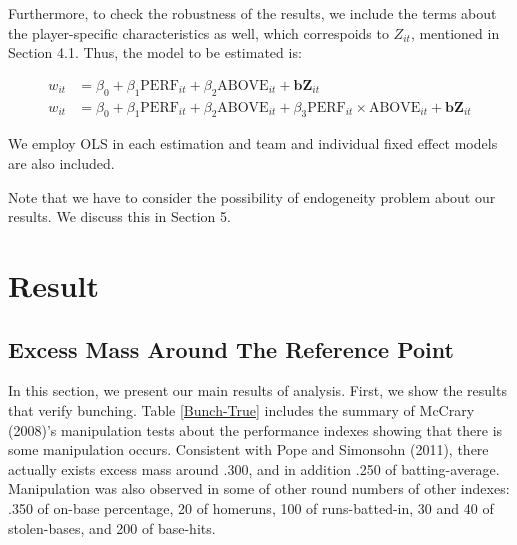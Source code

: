 \documentclass[dvipdfmx, 12pt]{article}
\begin{document}
  Furthermore, to check the robustness of the results, we include the terms about the player-specific characteristics as well, which correspoids to $Z_{it}$, mentioned in Section 4.1. Thus, the model to be estimated is:

  \begin{align*}
    w_{it} & = \beta_0 + \beta_1 \text{PERF}_{it} + \beta_2 \text{ABOVE}_{it} + \mathbf{b} \mathbf{Z}_{it} \\
    w_{it} &= \beta_0 + \beta_1 \text{PERF}_{it} + \beta_2 \text{ABOVE}_{it} + \beta_3 \text{PERF}_{it} \times \text{ABOVE}_{it} + \mathbf{b} \mathbf{Z}_{it}
  \end{align*}

  We employ OLS in each estimation and team and individual fixed effect models are also included.

  Note that we have to consider the possibility of endogeneity problem about our results. We discuss this in Section 5.

\section{Result}
\subsection{Excess Mass Around The Reference Point}

In this section, we present our main results of analysis. First, we show the results that verify bunching. Table \ref{Bunch-True} includes the summary of McCrary (2008)'s manipulation tests about the performance indexes showing that there is some manipulation occurs. Consistent with Pope and Simonsohn (2011), there actually exists excess mass around .300, and in addition .250 of batting-average. Manipulation was also observed in some of other round numbers of other indexes: .350 of on-base percentage, 20 of homeruns, 100 of runs-batted-in, 30 and 40 of stolen-bases, and 200 of base-hits.
\end{document}
